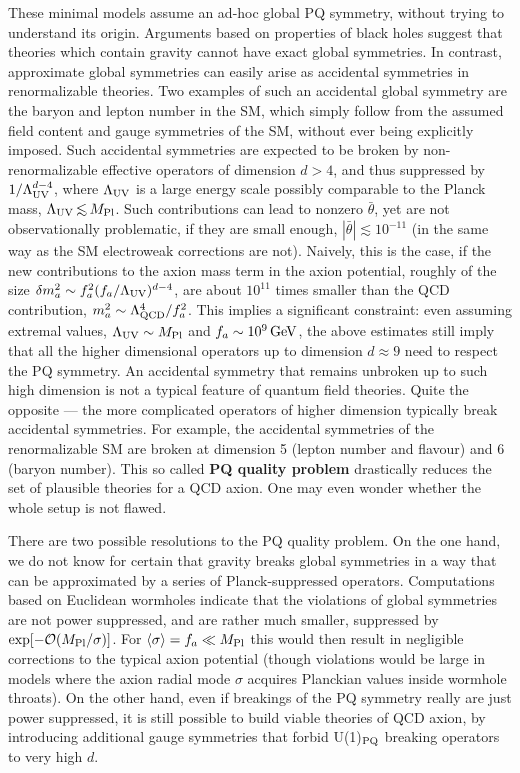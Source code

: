 These minimal models assume an ad-hoc global PQ symmetry, without trying to understand
its origin.  Arguments based on properties of black holes suggest that
theories which contain gravity cannot have exact global symmetries.
In contrast, approximate global symmetries can easily arise as accidental symmetries in renormalizable theories.
Two examples of such an accidental global symmetry are the baryon and lepton number in the SM, which simply follow from the assumed field content and gauge symmetries of the SM, without ever being explicitly imposed.
Such accidental symmetries are expected to be  broken by non-renormalizable
effective operators of dimension $d>4$, 
and thus suppressed by $1/\Lambda_{\rm UV}^{d-4}$, where $\Lambda_{\rm UV}$
is a large energy scale possibly comparable to the Planck mass,  $\Lambda_{\rm UV}\circa{<} M_{\rm Pl}$. 
Such contributions can lead to nonzero $\bar \theta$, yet are not observationally problematic, if they are small enough, $| \bar \theta| \lesssim 10^{-11}$ (in the same way as the SM electroweak corrections are not). Naively, this is the case, if the new contributions to the axion mass term in the axion potential, roughly of the size
$\delta m_a^2 \sim f_a^2 (f_a/\Lambda_{\rm UV})^{d-4}$, are about $10^{11}$ times smaller than the QCD contribution,
$m_a^2 \sim \Lambda_{\rm QCD}^4/f_a^2$.
This implies a significant constraint: 
even assuming extremal values, $\Lambda_{\rm UV}\sim M_{\rm Pl}$ and $f_a \sim 10^9\,{\rm GeV}$,
the above estimates still imply that all the higher dimensional operators up to dimension $d\approx 9$ need to respect the PQ symmetry.
An accidental symmetry that remains unbroken up to such high dimension 
is  not a typical feature of quantum field theories. Quite the opposite --- the more complicated operators of higher dimension typically break accidental symmetries.
For example, the accidental symmetries of the renormalizable  SM are broken at dimension 5 (lepton number and flavour) and 6 (baryon number).
This so called {\bf PQ quality problem}   drastically reduces the set of plausible theories for a QCD axion. One may even wonder whether 
the whole setup is not flawed.

There are two possible resolutions to the PQ quality problem. 
On the one hand, we do not know for certain that  gravity breaks global symmetries
in a way that can be approximated by a series of Planck-suppressed operators.
Computations based on Euclidean wormholes indicate that the violations of global symmetries are not power suppressed, and are rather much smaller, 
suppressed by $\exp[-{\cal O}(M_{\rm Pl}/\sigma)]$.
For $\langle \sigma\rangle=f_a \ll M_{\rm Pl}$ this would then result in negligible corrections to the typical axion potential (though violations would be large in models where the axion radial mode $\sigma$ acquires Planckian values
inside wormhole throats). On the other hand, even if breakings of the PQ symmetry really are just power suppressed, it is still possible to build viable theories of QCD axion, by introducing additional gauge symmetries that forbid  U(1)${}_{\rm PQ}$ breaking operators to very high $d$.








